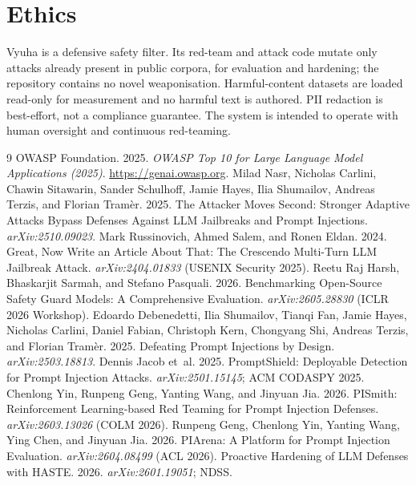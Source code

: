 \documentclass[11pt]{article}
\begin{document}
\section*{Ethics}
Vyuha is a defensive safety filter. Its red-team and attack code mutate only attacks already present
in public corpora, for evaluation and hardening; the repository contains no novel weaponisation.
Harmful-content datasets are loaded read-only for measurement and no harmful text is authored. PII
redaction is best-effort, not a compliance guarantee. The system is intended to operate with human
oversight and continuous red-teaming.

\begin{thebibliography}{9}
 OWASP Foundation. 2025. \emph{OWASP Top 10 for Large Language Model Applications (2025)}. \url{https://genai.owasp.org}.
 Milad Nasr, Nicholas Carlini, Chawin Sitawarin, Sander Schulhoff, Jamie Hayes, Ilia Shumailov, Andreas Terzis, and Florian Tram\`er. 2025. The Attacker Moves Second: Stronger Adaptive Attacks Bypass Defenses Against LLM Jailbreaks and Prompt Injections. \emph{arXiv:2510.09023}.
 Mark Russinovich, Ahmed Salem, and Ronen Eldan. 2024. Great, Now Write an Article About That: The Crescendo Multi-Turn LLM Jailbreak Attack. \emph{arXiv:2404.01833} (USENIX Security 2025).
 Reetu Raj Harsh, Bhaskarjit Sarmah, and Stefano Pasquali. 2026. Benchmarking Open-Source Safety Guard Models: A Comprehensive Evaluation. \emph{arXiv:2605.28830} (ICLR 2026 Workshop).
 Edoardo Debenedetti, Ilia Shumailov, Tianqi Fan, Jamie Hayes, Nicholas Carlini, Daniel Fabian, Christoph Kern, Chongyang Shi, Andreas Terzis, and Florian Tram\`er. 2025. Defeating Prompt Injections by Design. \emph{arXiv:2503.18813}.
 Dennis Jacob et~al. 2025. PromptShield: Deployable Detection for Prompt Injection Attacks. \emph{arXiv:2501.15145}; ACM CODASPY 2025.
 Chenlong Yin, Runpeng Geng, Yanting Wang, and Jinyuan Jia. 2026. PISmith: Reinforcement Learning-based Red Teaming for Prompt Injection Defenses. \emph{arXiv:2603.13026} (COLM 2026).
 Runpeng Geng, Chenlong Yin, Yanting Wang, Ying Chen, and Jinyuan Jia. 2026. PIArena: A Platform for Prompt Injection Evaluation. \emph{arXiv:2604.08499} (ACL 2026).
 Proactive Hardening of LLM Defenses with HASTE. 2026. \emph{arXiv:2601.19051}; NDSS.
\end{thebibliography}
\end{document}
